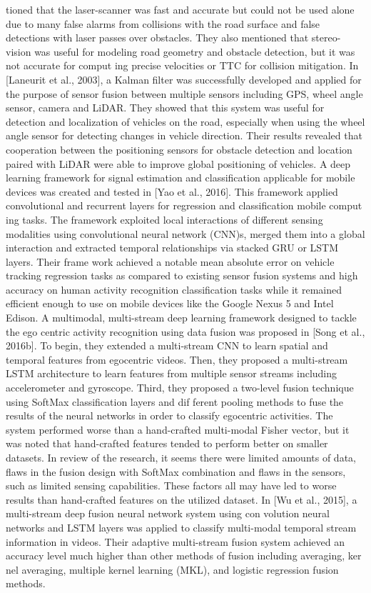 tioned that the laser-scanner was fast and accurate but could not be used alone due
to many false alarms from collisions with the road surface and false detections with
laser passes over obstacles. They also mentioned that stereo-vision was useful for
modeling road geometry and obstacle detection, but it was not accurate for comput
ing precise velocities or TTC for collision mitigation.
In [Laneurit et al., 2003], a Kalman ﬁlter was successfully developed and applied
for the purpose of sensor fusion between multiple sensors including GPS, wheel angle
sensor, camera and LiDAR. They showed that this system was useful for detection
and localization of vehicles on the road, especially when using the wheel angle sensor
for detecting changes in vehicle direction. Their results revealed that cooperation between the positioning sensors for obstacle detection and location paired with LiDAR
were able to improve global positioning of vehicles.
A deep learning framework for signal estimation and classiﬁcation applicable for
mobile devices was created and tested in [Yao et al., 2016]. This framework applied
convolutional and recurrent layers for regression and classiﬁcation mobile comput
ing tasks. The framework exploited local interactions of diﬀerent sensing modalities
using convolutional neural network (CNN)s, merged them into a global interaction
and extracted temporal relationships via stacked GRU or LSTM layers. Their frame
work achieved a notable mean absolute error on vehicle tracking regression tasks as
compared to existing sensor fusion systems and high accuracy on human activity
recognition classiﬁcation tasks while it remained eﬃcient enough to use on mobile
devices like the Google Nexus 5 and Intel Edison.
A multimodal, multi-stream deep learning framework designed to tackle the ego
centric activity recognition using data fusion was proposed in [Song et al., 2016b]. To
begin, they extended a multi-stream CNN to learn spatial and temporal features from
egocentric videos. Then, they proposed a multi-stream LSTM architecture to learn
features from multiple sensor streams including accelerometer and gyroscope. Third,
they proposed a two-level fusion technique using SoftMax classiﬁcation layers and dif
ferent pooling methods to fuse the results of the neural networks in order to classify
egocentric activities. The system performed worse than a hand-crafted multi-modal
Fisher vector, but it was noted that hand-crafted features tended to perform better
on smaller datasets. In review of the research, it seems there were limited amounts of
data, ﬂaws in the fusion design with SoftMax combination and ﬂaws in the sensors,
such as limited sensing capabilities. These factors all may have led to worse results
than hand-crafted features on the utilized dataset.
In [Wu et al., 2015], a multi-stream deep fusion neural network system using con
volution neural networks and LSTM layers was applied to classify multi-modal temporal stream information in videos. Their adaptive multi-stream fusion system achieved
an accuracy level much higher than other methods of fusion including averaging, ker
nel averaging, multiple kernel learning (MKL), and logistic regression fusion methods.



